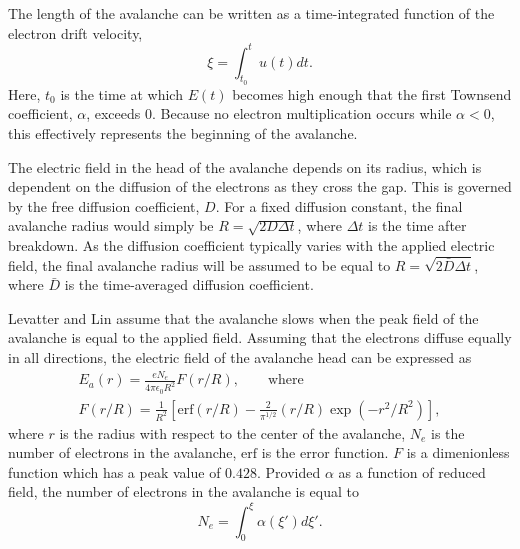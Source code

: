 The length of the avalanche can be written as a time-integrated function of the
electron drift velocity,
\begin{equation}
  \xi = \int_{t_0}^t u(t) dt.
  \label{eq:s_xi}
\end{equation}
Here, $t_0$ is the time at which $E(t)$ becomes high enough that the first
Townsend coefficient, $\alpha$, exceeds 0. Because no electron multiplication
occurs while $\alpha < 0$, this effectively represents the beginning of the
avalanche.

The electric field in the head of the avalanche depends on its radius, which is
dependent on the diffusion of the electrons as they cross the gap. This is
governed by the free diffusion coefficient, $D$. For a fixed diffusion constant,
the final avalanche radius would simply be $R = \sqrt{2D\Delta t}$, where
$\Delta t$ is the time after breakdown. As the diffusion coefficient typically
varies with the applied electric field, the final avalanche radius will be
assumed to be equal to $R = \sqrt{2\bar{D}\Delta t}$, where $\bar{D}$ is the
time-averaged diffusion coefficient.

Levatter and Lin assume that the avalanche slows when the peak field of the
avalanche is equal to the applied field. Assuming that the electrons diffuse
equally in all directions, the electric field of the avalanche head can be
expressed as
\begin{eqnarray}
  E_a(r) = \frac{eN_e}{4\pi\epsilon_0R^2} F(r/R), \qquad \mathrm{where} \\
  F(r/R) = \frac{1}{R^2}\left[\mathrm{erf}(r/R)-\frac{2}{\pi^{1/2}}
           (r/R)\exp(-r^2/R^2)\right] ,
\end{eqnarray}
where $r$ is the radius with respect to the center of the avalanche, $N_e$ is
the number of electrons in the avalanche, $\mathrm{erf}$ is the error function.
$F$ is a dimenionless function which has a peak value of $0.428$. Provided
$\alpha$ as a function of reduced field, the number of electrons in the
avalanche is equal to
\begin{equation}
  N_e = \int_0^\xi \alpha(\xi')d\xi'.
  \label{eq:s_pop}
\end{equation}

